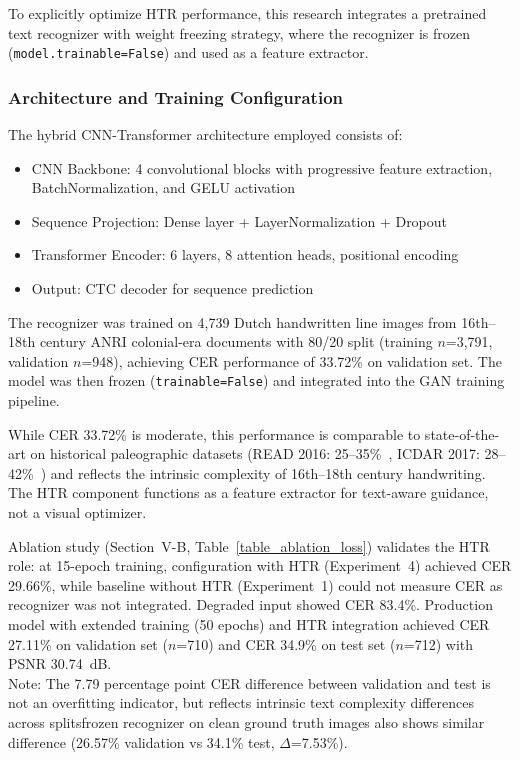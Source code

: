 \documentclass[journal]{IEEEtran}
\begin{document}
To explicitly optimize HTR performance, this research integrates a pretrained text recognizer with weight freezing strategy, where the recognizer is frozen (\texttt{model.trainable=False}) and used as a feature extractor.

\subsubsection{Architecture and Training Configuration}

The hybrid CNN-Transformer architecture employed consists of:
\begin{itemize}
    \item CNN Backbone: 4 convolutional blocks with progressive feature extraction, BatchNormalization, and GELU activation
    \item Sequence Projection: Dense layer + LayerNormalization + Dropout
    \item Transformer Encoder: 6 layers, 8 attention heads, positional encoding
    \item Output: CTC decoder for sequence prediction
\end{itemize}

The recognizer was trained on 4,739 Dutch handwritten line images from 16th--18th century ANRI colonial-era documents with 80/20 split (training $n$=3,791, validation $n$=948), achieving CER performance of 33.72\% on validation set. The model was then frozen (\texttt{trainable=False}) and integrated into the GAN training pipeline.

While CER 33.72\% is moderate, this performance is comparable to state-of-the-art on historical paleographic datasets (READ 2016: 25--35\%~\cite{sanchez2016icfhr}, ICDAR 2017: 28--42\%~\cite{sanchez2017icdar}) and reflects the intrinsic complexity of 16th--18th century handwriting. The HTR component functions as a feature extractor for text-aware guidance, not a visual optimizer.

Ablation study (Section~V-B, Table~\ref{table_ablation_loss}) validates the HTR role: at 15-epoch training, configuration with HTR (Experiment~4) achieved CER 29.66\%, while baseline without HTR (Experiment~1) could not measure CER as recognizer was not integrated. Degraded input showed CER 83.4\%. Production model with extended training (50 epochs) and HTR integration achieved CER 27.11\% on validation set ($n$=710) and CER 34.9\% on test set ($n$=712) with PSNR 30.74~dB. \\
Note: The 7.79 percentage point CER difference between validation and test is not an overfitting indicator, but reflects intrinsic text complexity differences across splits\textemdash frozen recognizer on clean ground truth images also shows similar difference (26.57\% validation vs 34.1\% test, $\Delta$=7.53\%).
\end{document}
